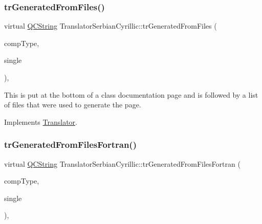 \mbox{\label{class_translator_serbian_cyrillic_a2f4c3c830e8c6b1e025b5a968bfa505c}} 
\subsubsection{\texorpdfstring{trGeneratedFromFiles()}{trGeneratedFromFiles()}}
{\footnotesize\ttfamily virtual \mbox{\hyperlink{class_q_c_string}{Q\+C\+String}} Translator\+Serbian\+Cyrillic\+::tr\+Generated\+From\+Files (\begin{DoxyParamCaption}\item[{\mbox{\hyperlink{class_class_def_ae70cf86d35fe954a94c566fbcfc87939}{Class\+Def\+::\+Compound\+Type}}}]{comp\+Type,  }\item[{bool}]{single }\end{DoxyParamCaption})\hspace{0.3cm}{\ttfamily [inline]}, {\ttfamily [virtual]}}

This is put at the bottom of a class documentation page and is followed by a list of files that were used to generate the page. 

Implements \mbox{\hyperlink{class_translator}{Translator}}.

\mbox{\label{class_translator_serbian_cyrillic_a5b2a691e024bc52e605ba86655d13500}} 
\subsubsection{\texorpdfstring{trGeneratedFromFilesFortran()}{trGeneratedFromFilesFortran()}}
{\footnotesize\ttfamily virtual \mbox{\hyperlink{class_q_c_string}{Q\+C\+String}} Translator\+Serbian\+Cyrillic\+::tr\+Generated\+From\+Files\+Fortran (\begin{DoxyParamCaption}\item[{\mbox{\hyperlink{class_class_def_ae70cf86d35fe954a94c566fbcfc87939}{Class\+Def\+::\+Compound\+Type}}}]{comp\+Type,  }\item[{bool}]{single }\end{DoxyParamCaption})\hspace{0.3cm}{\ttfamily [inline]}, {\ttfamily [virtual]}}

